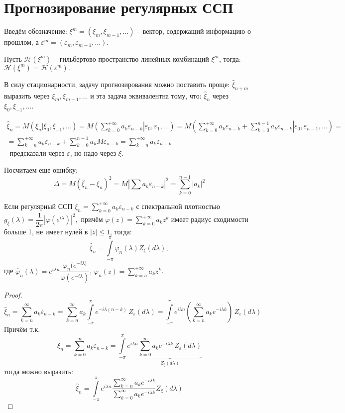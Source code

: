\section{Прогнозирование регулярных ССП}

Введём обозначение:
$\xi^m = \left( \xi_{m}, \xi_{m-1}, \dots \right) $ -- вектор, содержащий информацию о прошлом, а
$\varepsilon^m = \left( \varepsilon_m, \varepsilon_{m-1}, \dots \right) $.

Пусть $\mathcal{H}(\xi^m)$ -- гильбертово пространство линейных комбинаций $\xi^m$,
тогда: $\mathcal{H}(\xi^m) = \mathcal{H}(\varepsilon^m).$

В силу стационарности, задачу прогнозирования можно поставить проще: $\hat{\xi}_{n+m}$ выразить
через $\xi_m, \xi_{m-1}, \dots$ и эта задача эквивалентна тому, что:
$\hat{\xi}_n$ через $\xi_0, \xi_{-1}, \dots$.

\begin{multline*}
  \hat{\xi}_n = M(\xi_n | \xi_0, \xi_{-1}, \dots) =
  M \left( \left. \sum_{k=0}^{+\infty} a_k \varepsilon_{n-k} \right| \varepsilon_0, \varepsilon_1, \dots \right) =
    M \left( \left. \sum_{k=0}^{+\infty} a_k \varepsilon_{n-k} + \sum_{k=0}^{n-1} a_k \varepsilon_{n-k} \right| \varepsilon_0, \varepsilon_{n-1}, \dots \right) = \\
      = \sum_{k=n}^{+\infty} a_k\varepsilon_{n-k} + \sum_{k=0}^{n-1} a_k M\varepsilon_{n-k}
      = \sum_{k=n}^{+\infty} a_k \varepsilon_{n-k}
\end{multline*}
-- предсказали через $\varepsilon$, но надо через $\xi$.

Посчитаем еще ошибку:
\[
  \Delta = M(\hat{\xi}_n - \xi_n)^2 = M |\sum a_k \varepsilon_{n-k}|^2 = \sum_{k=0}^{n-1} |a_k|^2
\]

\begin{theorem}
  Если регулярный ССП $\xi_n = \sum_{k=0}^{+\infty} a_k \varepsilon_{n-k}$ с
  спектральной плотностью $g_\xi(\lambda) = \dfrac{1}{2\pi} |\varphi(e^{i\lambda})|^2,$
  причём $\varphi(z) = \sum_{k=0}^{+\infty} a_k z^k$ имеет радиус сходимости больше 1,
  не имеет нулей в $|z| \leqslant 1$, тогда:
  \[
    \hat{\xi}_n = \int\limits_{-\pi}^\pi \hat{\varphi}_n(\lambda) Z_\xi(d\lambda),
  \]
  где $\hat{\varphi}_n(\lambda) = e^{i\lambda n} \dfrac{\varphi_n(e^{-i\lambda)}}{\varphi(e^{-i\lambda})}$, $\varphi_n(z) = \sum_{k=n}^{+\infty} a_k z^k$.
\end{theorem}
\begin{proof}
  \[
    \hat{\xi}_n = \sum_{k=n}^\infty a_k \varepsilon_{n-k} =
    \sum_{k=n}^\infty a_k \int\limits_{-\pi}^\pi e^{-i\lambda (n-k)} \, Z_\varepsilon(d\lambda)
    =
    \int\limits_{-\pi}^\pi e^{i\lambda n} \left( \sum_{k=n}^\infty a_k e^{-i\lambda k} \right) \, Z_\varepsilon(d\lambda)
  \]
  Причём т.к.
  \[
    \xi_n = \sum_{k=0}^\infty a_k \varepsilon_{n-k} = \int\limits_{-\pi}^\pi e^{i\lambda n} \underbrace{\sum_{k=0}^\infty a_k e^{-i\lambda k} \, Z_\varepsilon(d\lambda)}_{Z_\xi(d\lambda)}
  \]
  тогда можно выразить:
  \[
    \hat{\xi}_n = \int\limits_{-\pi}^\pi e^{i\lambda n} \dfrac{\sum_{k=n}^\infty a_k e^{-i\lambda k}}{\sum_{k=0}^\infty a_k e^{-i\lambda k}} Z_\xi(d\lambda)
  \]
\end{proof}

